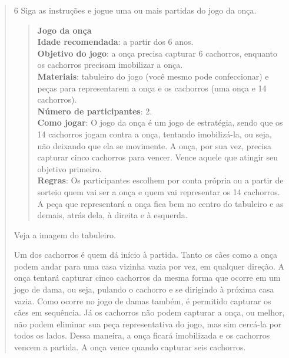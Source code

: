 \begin{escolha}
\begin{quote}
\num{6} Siga as instruções e jogue uma ou mais partidas do jogo da onça.

\begin{quote}
\textbf{Jogo da onça}\\
\textbf{Idade recomendada}: a partir dos 6 anos.\\
\textbf{Objetivo do jogo}: a onça precisa capturar 6 cachorros, enquanto
os cachorros precisam imobilizar a onça.\\
\textbf{Materiais}: tabuleiro do jogo (você mesmo pode confeccionar) e
peças para representarem a onça e os cachorros (uma onça e 14
cachorros).\\
\textbf{Número de participantes}: 2.\\
\textbf{Como jogar}: O jogo da onça é um jogo de estratégia, sendo que
os 14 cachorros jogam contra a onça, tentando imobilizá-la, ou seja, não
deixando que ela se movimente. A onça, por sua vez, precisa capturar
cinco cachorros para vencer. Vence aquele que atingir seu objetivo
primeiro.\\
\textbf{Regras}: Os participantes escolhem por conta própria ou a partir
de sorteio quem vai ser a onça e quem vai representar os 14 cachorros. A
peça que representará a onça fica bem no centro do tabuleiro e as
demais, atrás dela, à direita e à esquerda.
\end{quote}

Veja a imagem do tabuleiro.


Um dos cachorros é quem dá início à partida. Tanto os cães como a onça
podem andar para uma casa vizinha vazia por vez, em qualquer direção. A
onça tentará capturar cinco cachorros da mesma forma que ocorre em um
jogo de dama, ou seja, pulando o cachorro e se dirigindo à próxima casa
vazia. Como ocorre no jogo de damas também, é permitido capturar os
cães em sequência. Já os cachorros não podem capturar a onça, ou melhor,
não podem eliminar sua peça representativa do jogo, mas sim cercá-la por
todos os lados. Dessa maneira, a onça ficará imobilizada e os cachorros
vencem a partida. A onça vence quando capturar seis cachorros.




\end{quote}
\end{escolha}
